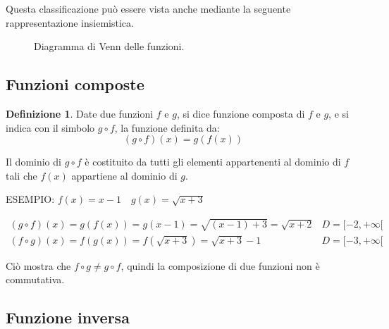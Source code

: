 \documentclass[a4paper]{article}
\theoremstyle{plain}
\theoremstyle{definition}
\newtheorem{definizione}{Definizione}
\theoremstyle{remark}
\begin{document}
\newpage
Questa classificazione può essere vista anche mediante la seguente rappresentazione insiemistica.
\begin{figure}[htbp]
  \centering
  \caption{Diagramma di Venn delle funzioni.}
\end{figure}
\newpage
\subsection{Funzioni composte}
\begin{definizione}
    Date due funzioni $f$ e $g$, si dice funzione composta di $f$ e $g$, e si indica con il simbolo $g\circ f$, la funzione definita da:
    \begin{equation}
        (g\circ f)(x)=g(f(x))
    \end{equation}
\end{definizione}
Il dominio di $g\circ f$ è costituito da tutti gli elementi appartenenti al dominio di $f$ tali che $f(x)$ appartiene al dominio di $g$.

ESEMPIO: $f(x)=x-1\quad g(x)=\sqrt{x+3}$

$\begin{array}{ll}
    (g\circ f)(x)=g(f(x))=g(x-1)=\sqrt{(x-1)+3}=\sqrt{x+2} & D=[-2,+\infty[ \\
    (f\circ g)(x)=f(g(x))=f(\sqrt{x+3})=\sqrt{x+3}-1 & D=[-3,+\infty[
\end{array}$

Ciò mostra che $f\circ g\ne g\circ f$, quindi la composizione di due funzioni non è commutativa.
\newpage
\subsection{Funzione inversa}
\end{document}

